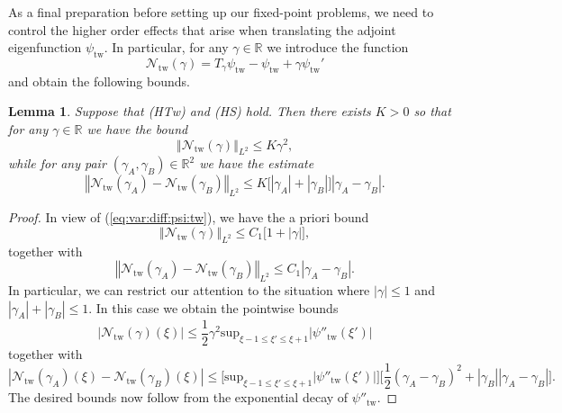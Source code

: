 \documentclass[10pt]{articleHJ}
\newcommand{\Real}{\mathbb{R}}							%
\newcommand{\abs}[1]{\left\vert#1\right\vert}			%
\newcommand{\norm}[1]{\left\Vert#1\right\Vert}		%
\newcommand{\sref}[1]{(\ref{#1})}                       %
\newtheorem{lem}[thm]{Lemma}
\numberwithin{equation}{section}
\begin{document}
As a final preparation before
setting up our fixed-point problems,
we need to control the higher order effects
that arise when translating the adjoint eigenfunction $\psi_{\mathrm{tw}}$.
In particular, for any $\gamma \in \Real$
we introduce the function
\begin{equation}
\mathcal{N}_{\mathrm{tw}}(\gamma)
= T_{\gamma} \psi_{\mathrm{tw}} - \psi_{\mathrm{tw}} + \gamma \psi_{\mathrm{tw}}'
\end{equation}
and obtain the following bounds.
%
\begin{lem}
\label{lem:swv:shifts:ntw}
Suppose that (HTw) and (HS) hold. Then there exists $K > 0$
so that for any $\gamma \in \Real$ we have the bound
\begin{equation}
\norm{ \mathcal{N}_{\mathrm{tw}}(\gamma) }_{L^2} \le K \gamma^2,
\end{equation}
while for any pair $(\gamma_A, \gamma_B) \in \Real^2$
we have the estimate
\begin{equation}
\norm{ \mathcal{N}_{\mathrm{tw}}(\gamma_A)
  - \mathcal{N}_{\mathrm{tw}}(\gamma_B) }_{L^2} \le
   K \big[ \abs{\gamma_A } + \abs{\gamma_B} \big]
     \abs{\gamma_A - \gamma_B}.
\end{equation}
\end{lem}
\begin{proof}
In view of \sref{eq:var:diff:psi:tw},
we have the a priori bound
\begin{equation}
\norm{\mathcal{N}_{\mathrm{tw}}(\gamma)}_{L^2} \le C_1 \big[ 1 + \abs{\gamma} \big],
\end{equation}
together with
\begin{equation}
\norm{ \mathcal{N}_{\mathrm{tw}}(\gamma_A)
  - \mathcal{N}_{\mathrm{tw}}(\gamma_B) }_{L^2}
 \le C_1  \abs{\gamma_A-\gamma_B}.
\end{equation}
In particular, we can restrict our attention to the situation
where $\abs{\gamma} \le 1$ and $\abs{\gamma_A} + \abs{\gamma_B} \le 1$.
In this case we obtain the pointwise bounds
\begin{equation}
\abs{\mathcal{N}_{\mathrm{tw}}(\gamma)(\xi) } \le \frac{1}{2} \gamma^2
  \mathrm{sup}_{\xi - 1 \le \xi' \le \xi + 1} \abs{\psi''_{\mathrm{tw}}(\xi') }
\end{equation}
together with
\begin{equation}
\abs{\mathcal{N}_{\mathrm{tw}}(\gamma_A)(\xi)
  - \mathcal{N}_{\mathrm{tw}}(\gamma_B)(\xi) } \le
  \big[\mathrm{sup}_{\xi - 1 \le \xi' \le \xi + 1} \abs{\psi''_{\mathrm{tw}}(\xi') } \big]
  \big[ \frac{1}{2} (\gamma_A - \gamma_B)^2
    + \abs{\gamma_B} \abs{\gamma_A - \gamma_B}
  \big] .
\end{equation}
The desired bounds now follow from the exponential decay of $\psi''_{\mathrm{tw}}$.
\end{proof}
\end{document}
